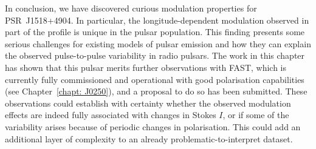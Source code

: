 In conclusion, we have discovered curious modulation properties for PSR~J1518+4904. In particular, the longitude-dependent modulation observed in part of the profile is unique in the pulsar population. This finding presents some serious challenges for existing models of pulsar emission and how they can explain the observed pulse-to-pulse variability in radio pulsars. The work in this chapter has shown that this pulsar merits further observations with FAST, which is currently fully commissioned and operational with good polarisation capabilities (see Chapter~\ref{chapt: J0250}), and a proposal to do so has been submitted. These observations could establish with certainty whether the observed modulation effects are indeed fully associated with changes in Stokes $I$, or if some of the variability arises because of periodic changes in polarisation. This could add an additional layer of complexity to an already problematic-to-interpret dataset.


